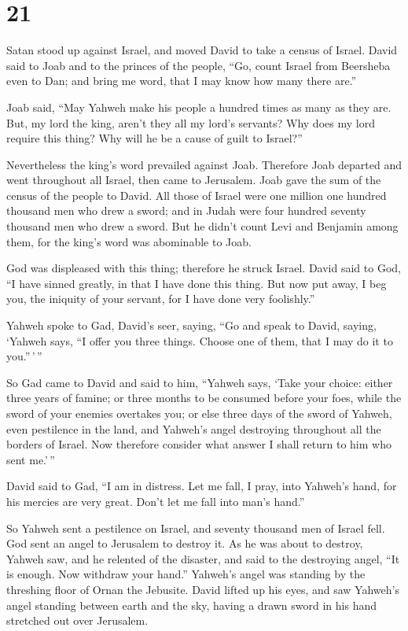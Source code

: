 \hypertarget{section-20}{%
\section{21}\label{section-20}}

 Satan stood up against Israel, and moved David to take a
census of Israel.  David said to Joab and to the princes of
the people, ``Go, count Israel from Beersheba even to Dan; and bring me
word, that I may know how many there are.''

 Joab said, ``May Yahweh make his people a hundred times as
many as they are. But, my lord the king, aren't they all my lord's
servants? Why does my lord require this thing? Why will he be a cause of
guilt to Israel?''

 Nevertheless the king's word prevailed against Joab.
Therefore Joab departed and went throughout all Israel, then came to
Jerusalem.  Joab gave the sum of the census of the people to
David. All those of Israel were one million one hundred thousand men who
drew a sword; and in Judah were four hundred seventy thousand men who
drew a sword.  But he didn't count Levi and Benjamin among
them, for the king's word was abominable to Joab.

 God was displeased with this thing; therefore he struck
Israel.  David said to God, ``I have sinned greatly, in that
I have done this thing. But now put away, I beg you, the iniquity of
your servant, for I have done very foolishly.''

 Yahweh spoke to Gad, David's seer, saying, 
``Go and speak to David, saying, `Yahweh says, ``I offer you three
things. Choose one of them, that I may do it to you.''\,'\,''

 So Gad came to David and said to him, ``Yahweh says, `Take
your choice:  either three years of famine; or three months
to be consumed before your foes, while the sword of your enemies
overtakes you; or else three days of the sword of Yahweh, even
pestilence in the land, and Yahweh's angel destroying throughout all the
borders of Israel. Now therefore consider what answer I shall return to
him who sent me.'\,''

 David said to Gad, ``I am in distress. Let me fall, I
pray, into Yahweh's hand, for his mercies are very great. Don't let me
fall into man's hand.''

 So Yahweh sent a pestilence on Israel, and seventy
thousand men of Israel fell.  God sent an angel to
Jerusalem to destroy it. As he was about to destroy, Yahweh saw, and he
relented of the disaster, and said to the destroying angel, ``It is
enough. Now withdraw your hand.'' Yahweh's angel was standing by the
threshing floor of Ornan the Jebusite.  David lifted up his
eyes, and saw Yahweh's angel standing between earth and the sky, having
a drawn sword in his hand stretched out over Jerusalem.

